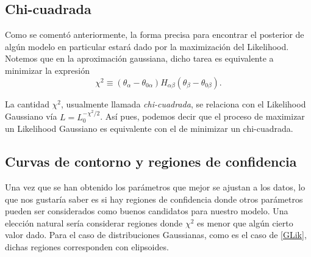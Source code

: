 \documentclass[10.5pt,prb,
               showpacs,            %
               preprintnumbers,     %
               aps,                 %
               prl,          	    %
               letterpaper,             %
               superscriptaddress,      %
               nofootinbib,         %
               tightenlines,        %
               floats,floatfix      %
               ,usenatbib]{revtex4-1}%
\begin{document}


\subsection{Chi-cuadrada}

Como se coment\'o anteriormente, la forma precisa para encontrar el posterior de alg\'un modelo en 
particular estar\'a dado por la maximizaci\'on  del Likelihood. Notemos que en la aproximaci\'on gaussiana, dicho 
tarea es equivalente a minimizar la expresi\'on 
%
	\begin{equation}\label{chi2}
		\chi^2\equiv(\theta_\alpha-\theta_{0\alpha})H_{\alpha\beta}(\theta_\beta-\theta_{0\beta}).
	\end{equation}

\noindent
La cantidad $\chi^2$, usualmente llamada \textit{chi-cuadrada}, se relaciona con el Likelihood 
Gaussiano v\'ia $L=L_0^{-\chi^2/2}$. As\'i pues, podemos decir que el proceso de maximizar un 
Likelihood Gaussiano es equivalente con el de minimizar un chi-cuadrada. 

\subsection{Curvas de contorno y regiones de confidencia}

Una vez que se han obtenido los par\'ametros que mejor se ajustan a los datos, lo que nos gustar\'ia saber 
es si hay regiones de confidencia donde otros par\'ametros pueden ser considerados como buenos candidatos 
para nuestro modelo. Una elecci\'on natural ser\'ia considerar regiones donde $\chi^2$ es menor que alg\'un 
cierto valor dado. Para el caso de distribuciones Gaussianas, como es el caso de \eqref{GLik}, 
dichas regiones corresponden con elipsoides.
\end{document}
